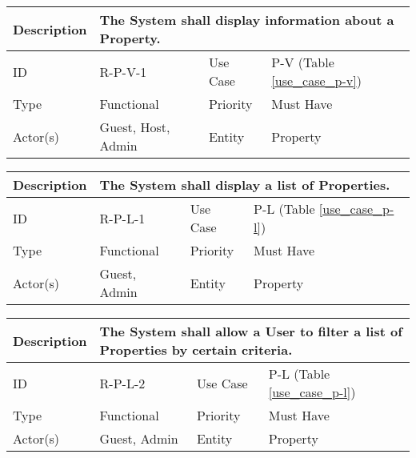 \begin{tabular}{|p{1.5cm}|p{1.5cm}|p{1.5cm}|p{1.5cm}|p{1.5cm}|p{1.5cm}|p{1.5cm}|p{1.5cm}|p{1.5cm}|p{1.5cm}|p{1.5cm}|p{1.5cm}|}
    \hline
    \multicolumn{2}{|o|}{Description} & \multicolumn{10}{p{12.5cm}|}{The System shall display information about a Property.} \\ \hline
    \multicolumn{2}{|o|}{ID}          & \multicolumn{4}{n}{R-P-V-1}            & \multicolumn{2}{|o|}{Use Case}    & \multicolumn{4}{n|}{P-V (Table \ref{use_case_p-v})} \\ \hline
    \multicolumn{2}{|o|}{Type}        & \multicolumn{4}{n}{Functional}         & \multicolumn{2}{|o|}{Priority}    & \multicolumn{4}{n|}{Must Have}  \\ \hline
    \multicolumn{2}{|o|}{Actor(s)}    & \multicolumn{4}{n}{Guest, Host, Admin} & \multicolumn{2}{|o|}{Entity}      & \multicolumn{4}{n|}{Property} \\ \hline
\end{tabular}

\begin{tabular}{|p{1.5cm}|p{1.5cm}|p{1.5cm}|p{1.5cm}|p{1.5cm}|p{1.5cm}|p{1.5cm}|p{1.5cm}|p{1.5cm}|p{1.5cm}|p{1.5cm}|p{1.5cm}|}
    \hline
    \multicolumn{2}{|o|}{Description} & \multicolumn{10}{p{12.5cm}|}{The System shall display a list of Properties.} \\ \hline
    \multicolumn{2}{|o|}{ID}          & \multicolumn{4}{n}{R-P-L-1}            & \multicolumn{2}{|o|}{Use Case}    & \multicolumn{4}{n|}{P-L (Table \ref{use_case_p-l})} \\ \hline
    \multicolumn{2}{|o|}{Type}        & \multicolumn{4}{n}{Functional}         & \multicolumn{2}{|o|}{Priority}    & \multicolumn{4}{n|}{Must Have}  \\ \hline
    \multicolumn{2}{|o|}{Actor(s)}    & \multicolumn{4}{n}{Guest, Admin}       & \multicolumn{2}{|o|}{Entity}      & \multicolumn{4}{n|}{Property} \\ \hline
\end{tabular}

\begin{tabular}{|p{1.5cm}|p{1.5cm}|p{1.5cm}|p{1.5cm}|p{1.5cm}|p{1.5cm}|p{1.5cm}|p{1.5cm}|p{1.5cm}|p{1.5cm}|p{1.5cm}|p{1.5cm}|}
    \hline
    \multicolumn{2}{|o|}{Description} & \multicolumn{10}{p{12.5cm}|}{The System shall allow a User to filter a list of Properties by certain criteria.} \\ \hline
    \multicolumn{2}{|o|}{ID}          & \multicolumn{4}{n}{R-P-L-2}            & \multicolumn{2}{|o|}{Use Case}    & \multicolumn{4}{n|}{P-L (Table \ref{use_case_p-l})} \\ \hline
    \multicolumn{2}{|o|}{Type}        & \multicolumn{4}{n}{Functional}         & \multicolumn{2}{|o|}{Priority}    & \multicolumn{4}{n|}{Must Have}  \\ \hline
    \multicolumn{2}{|o|}{Actor(s)}    & \multicolumn{4}{n}{Guest, Admin}       & \multicolumn{2}{|o|}{Entity}      & \multicolumn{4}{n|}{Property} \\ \hline
\end{tabular}

